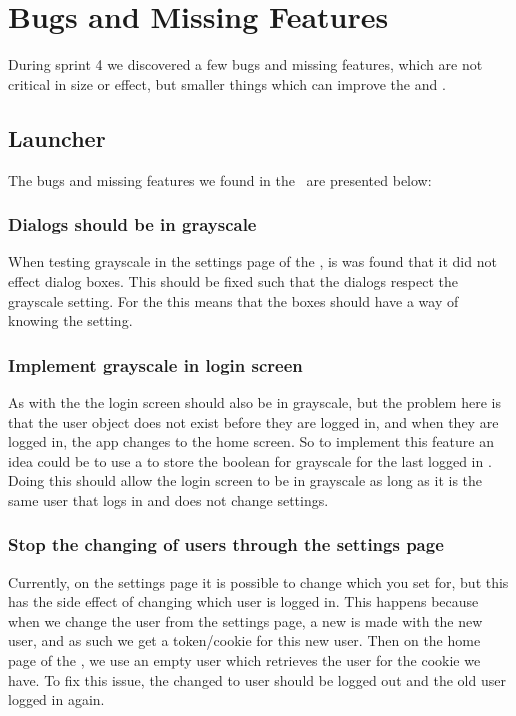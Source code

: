 \section{Bugs and Missing Features}
During sprint 4 we discovered a few bugs and missing features, which are not
critical in size or effect, but smaller things which can improve the
 and \clib.

\subsection{Launcher}
The bugs and missing features we found in the \lapp\ are presented below:

\subsubsection{Dialogs should be in grayscale}
When testing grayscale in the settings page of the , is was
found that it did not effect dialog boxes. This should be fixed such that the
dialogs respect the grayscale setting. For the  this means
that the boxes should have a way of knowing the setting.

\subsubsection{Implement grayscale in login screen}
As with the  the login screen should also be in
grayscale, but the problem here is that the user object does not exist before
they are logged in, and when they are logged in, the app changes to the home screen. So
to implement this feature an idea could be to use a  to
store the boolean for grayscale for the last logged in . Doing this
should allow the login screen to be in grayscale as long as it is the same user that logs
in and does not change settings.

\subsubsection{Stop the changing of users through the settings page}
Currently, on the settings page it is possible to change which  you
set  for, but this has the side effect of changing which user is
logged in. This happens because when we change the user from the settings
page, a new  is made with the new user, and as such we get
a token/cookie for this new user. Then on the home page of the
, we use an empty user  which retrieves the
user for the cookie we have. To fix this issue, the changed to user should be
logged out and the old user logged in again.

